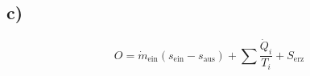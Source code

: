 

\subsection*{c)}

\[
O = \dot{m}_{\text{ein}} (s_{\text{ein}} - s_{\text{aus}}) + \sum \frac{\dot{Q}_i}{T_i} + S_{\text{erz}}
\]